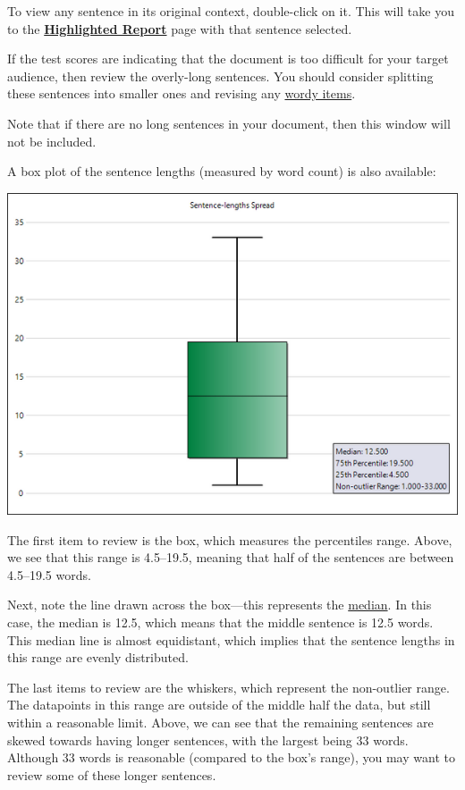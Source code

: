 \documentclass[
]{book}
\theoremstyle{definition}
\theoremstyle{definition}
\theoremstyle{definition}
\theoremstyle{definition}
\theoremstyle{remark}
\begin{document}
To view any sentence in its original context, double-click on it. This will take you to the \protect\hyperlink{reviewing-standard-grammar}{\textbf{Highlighted Report}} page with that sentence selected.

If the test scores are indicating that the document is too difficult for your target audience, then review the overly-long sentences. You should consider splitting these sentences into smaller ones and revising any \protect\hyperlink{reviewing-wordy-items}{wordy items}.

Note that if there are no long sentences in your document, then this window will not be included.

A box plot of the sentence lengths (measured by word count) is also available:

\includegraphics{Images/SentencesBoxplot.png}

The first item to review is the box, which measures the percentiles range. Above, we see that this range is 4.5--19.5, meaning that half of the sentences are between 4.5--19.5 words.

Next, note the line drawn across the box---this represents the \protect\hyperlink{stat-terms}{median}. In this case, the median is 12.5, which means that the middle sentence is 12.5 words. This median line is almost equidistant, which implies that the sentence lengths in this range are evenly distributed.

The last items to review are the whiskers, which represent the non-outlier range. The datapoints in this range are outside of the middle half the data, but still within a reasonable limit. Above, we can see that the remaining sentences are skewed towards having longer sentences, with the largest being 33 words. Although 33 words is reasonable (compared to the box's range), you may want to review some of these longer sentences.
\end{document}
